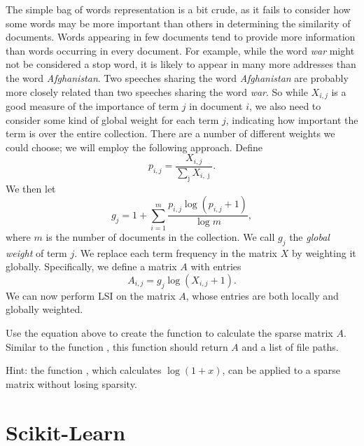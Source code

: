 The simple bag of words representation is a bit crude, as it fails to consider how some words may be more important than others in determining the similarity of documents.
Words appearing in few documents tend to provide more information than words occurring in every document.
For example, while the word \emph{war} might not be considered a stop word, it is likely to appear in many more addresses than the word \emph{Afghanistan}.
Two speeches sharing the word \emph{Afghanistan} are probably more closely related than two speeches sharing the word \emph{war}.
So while $X_{i,j}$ is a good measure of the importance of term $j$ in document $i$, we also need to consider some kind of global weight for each term $j$, indicating how important the term is over the entire collection.
There are a number of different weights we could choose; we will employ the following approach.
Define
\begin{equation*}
p_{i,j} = \frac{X_{i,j}}{\sum_{\bar{\jmath}} X_{i,\bar{\jmath}}}.
\end{equation*}
We then let
\begin{equation*}
g_{j} = 1 + \sum_{i=1}^{m} \frac{p_{i,j} \log (p_{i,j} + 1)}{\log m},
\end{equation*}
where $m$ is the number of documents in the collection.
We call $g_{j}$ the \emph{global weight} of term $j$.
We replace each term frequency in the matrix $X$ by weighting it globally.
Specifically, we define a matrix $A$ with entries
\begin{equation*}
A_{i,j} = g_{j} \log (X_{i,j} + 1).
\end{equation*}
We can now perform LSI on the matrix $A$, whose entries are both locally and globally weighted.

\begin{problem} %
Use the equation above to create the function  to calculate the sparse matrix $A$.
Similar to the function , this function should return $A$ and a list of file paths.

Hint: the function , which calculates $\log(1+x)$, can be applied to a sparse matrix without losing sparsity.
\label{problem:global-weights}
\end{problem}

\section*{Scikit-Learn} %

